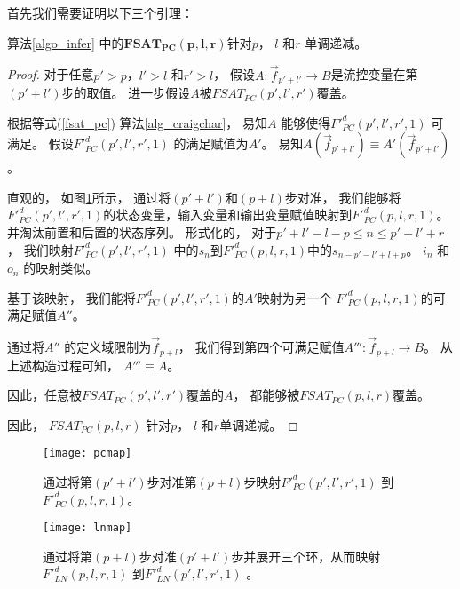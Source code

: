 首先我们需要证明以下三个引理：

\begin{lemma}\label{lemmapcdec}
算法\ref{algo_infer} 中的$\mathbf{FSAT_{PC}(p,l,r)}$针对$p$， $l$ 和$r$ 单调递减。
\end{lemma}
\begin{proof}
对于任意$p'>p$，$l'>l$ 和$r'>l$，
假设$A:\vec{f}_{p'+l'}\to B$是流控变量在第$(p'+l')$步的取值。
进一步假设$A$被$FSAT_{PC}(p',l',r')$覆盖。

根据等式(\ref{fsat_pc}) 算法\ref{alg_craigchar}，
易知$A$ 能够使得$F'^d_{PC}(p',l',r',1)$ 可满足。
假设$F'^d_{PC}(p',l',r',1)$ 的满足赋值为$A'$。
易知$A(\vec{f}_{p'+l'})\equiv A'(\vec{f}_{p'+l'})$。

直观的，
如图\ref{fig_pcmap}所示，
通过将$(p'+l')$和$(p+l)$步对准，
我们能够将$F'^d_{PC}(p',l',r',1)$的状态变量，输入变量和输出变量赋值映射到$F'^d_{PC}(p,l,r,1)$。
并淘汰前置和后置的状态序列。
形式化的，
对于$p'+l'-l-p\le n\le p'+l'+r$，
我们映射$F'^d_{PC}(p',l',r',1)$ 中的$s_n$到$F'^d_{PC}(p,l,r,1)$中的$s_{n-p'-l'+l+p}$。
$i_n$ 和$o_n$ 的映射类似。

基于该映射，
我们能将$F'^d_{PC}(p',l',r',1)$的$A'$映射为另一个
$F'^d_{PC}(p,l,r,1)$的可满足赋值$A''$。

通过将$A''$ 的定义域限制为$\vec{f}_{p+l}$，
我们得到第四个可满足赋值$A''':\vec{f}_{p+l}\to B$。
从上述构造过程可知，
$A'''\equiv A$。

因此，任意被$FSAT_{PC}(p',l',r')$覆盖的$A$，
都能够被$FSAT_{PC}(p,l,r)$覆盖。

因此，
$FSAT_{PC}(p,l,r)$ 针对$p$， $l$ 和$r$单调递减。
\end{proof}

\begin{figure}[t]
\begin{center}
\texttt{[image: pcmap]}
\end{center}
\caption{通过将第$(p'+l')$步对准第$(p+l)$步映射$F'^d_{PC}(p',l',r',1)$ 到$F'^d_{PC}(p,l,r,1)$。}
  \label{fig_pcmap}
\end{figure}

\begin{figure}[b]
\begin{center}
\texttt{[image: lnmap]}
\end{center}
\caption{通过将第$(p+l)$步对准$(p'+l')$步并展开三个环，从而映射$F'^d_{LN}(p,l,r,1)$ 到$F'^d_{LN}(p',l',r',1)$ 。}
  \label{fig_lnmap}
\end{figure}

